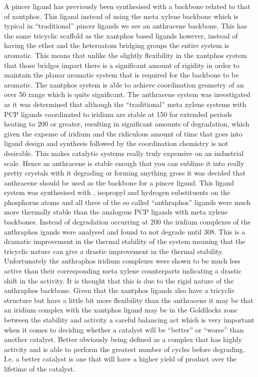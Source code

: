 A pincer ligand has previously been synthesised with a backbone related to that of xantphos.  This ligand instead of using the meta xylene backbone which is typical in ``traditional'' pincer ligands we see an anthracene backbone.  This has the same tricyclic scaffold as the xantphos based ligands however, instead of having the ether and the heteroatom bridging groups the entire system is aromatic.  This means that unlike the slightly flexibility in the xantphos system that those bridges impart there is a significant amount of rigidity in order to maintain the planar aromatic system that is required for the backbone to be aromatic.  The xantphos system is able to achieve coordination geometry of an over 50\degrees{} range which is quite significant.  The anthracene system was investigated as it was determined that although the ``traditional'' meta xylene systems with PCP ligands coordinated to iridium are stable at 150\degC{} for extended periods heating to 200\degC{} or greater, resulting in significant amounts of degradation, which given the expense of iridium and the ridiculous amount of time that goes into ligand design and synthesis followed by the coordination chemistry is not desirable.  This makes catalytic systems really truly expensive on an industrial scale.  Hence as anthracene is stable enough that you can sublime it into really pretty crystals with it degrading or forming anything gross it was decided that anthracene should be used as the backbone for a pincer ligand.  This ligand system was synthesised with \tBu, isopropyl and hydrogen substituents on the phosphorus atoms and all three of the so called ``anthraphos'' ligands were much more thermally stable than the analogous PCP ligands with meta xylene backbones.  Instead of degradation occurring at 200\degC{} the iridium complexes of the anthraphos igands were analysed and found to not degrade until 308\degC.  This is a dramatic improvement in the thermal stability of the system meaning that the tricyclic nature can give a drastic improvement in the thermal stability.  Unfortunately the anthraphos iridium complexes were shown to be much less active than their corresponding meta xylene counterparts indicating a drastic shift in the activity.  It is thought that this is due to the rigid nature of the anthraphos backbone.  Given that the xantphos ligands also have a tricyclic structure but have a little bit more flexibility than the anthracene it may be that an iridium complex with the xantphos ligand may be in the Goldilocks zone between the stability and activity a careful balancing act which is very important when it comes to deciding  whether a catalyst will be ``better'' or ``worse'' than another catalyst.  Better obviously being defined as a complex that has highly activity and is able to perform the greatest number of cycles before degrading.  I.e. a better catalyst is one that will have a higher yield of product over the lifetime of the catalyst.  

